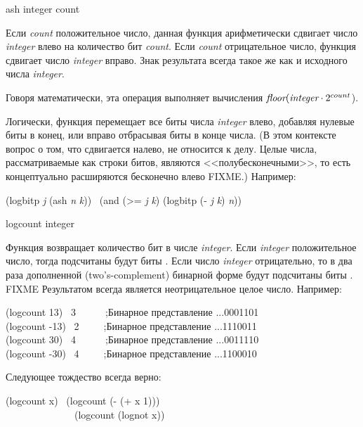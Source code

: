 \begin{defun}[Функция]
ash integer count

Если \emph{count} положительное число, данная функция арифметически сдвигает
число \emph{integer} влево на количество бит \emph{count}. Если \emph{count}
отрицательное число, функция сдвигает число \emph{integer} вправо.  
Знак результата всегда такое же как и исходного числа \emph{integer}.

Говоря математически, эта операция выполняет вычисления
$\emph{floor}(\emph{integer}\cdot2^{count}$).

Логически, функция перемещает все биты числа \emph{integer} влево, добавляя
нулевые биты в конец, или вправо отбрасывая биты в конце числа. (В этом
контексте вопрос о том, что сдвигается налево, не относится к делу. Целые
числа, рассматриваемые как строки битов, являются <<полубесконечными>>,
то есть концептуально расширяются бесконечно влево FIXME.)
Например:
\begin{lisp}
(logbitp \emph{j} (ash \emph{n} \emph{k})) \EQ\ (and (>= \emph{j} \emph{k}) (logbitp (- \emph{j} \emph{k}) \emph{n}))
\end{lisp}
\end{defun}

\begin{defun}[Функция]
logcount integer

Функция возвращает количество бит в числе \emph{integer}.
Если \emph{integer} положительное число, тогда подсчитаны будут биты
. Если число \emph{integer} отрицательно, то в два раза дополненной
(two's-complement) бинарной форме будут подсчитаны биты
. FIXME 
Результатом всегда является неотрицательное целое число.
Например:
\begin{lisp}
(logcount 13) \EV\ 3~~~~~~;\textrm{Бинарное представление} ...0001101 \\
(logcount -13) \EV\ 2~~~~~;\textrm{Бинарное представление} ...1110011 \\
(logcount 30) \EV\ 4~~~~~~;\textrm{Бинарное представление} ...0011110 \\
(logcount -30) \EV\ 4~~~~~;\textrm{Бинарное представление} ...1100010
\end{lisp}
Следующее тождество всегда верно:
\begin{lisp}
(logcount x) \EQ\ (logcount (- (+ x 1))) \\
~~~~~~~~~~~~~\EQ\ (logcount (lognot x))
\end{lisp}
\end{defun}

